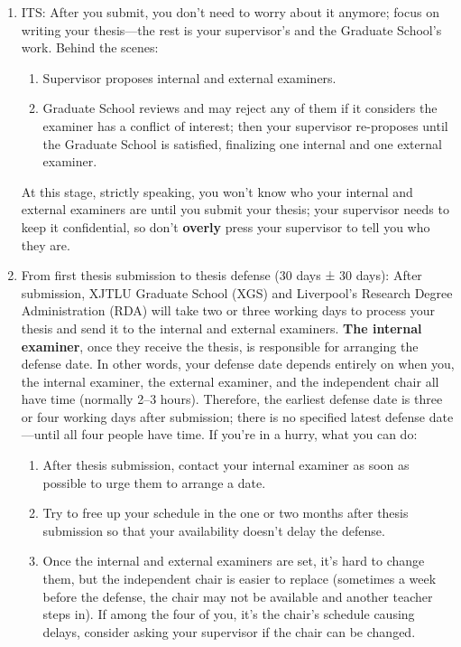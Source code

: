 \begin{enumerate}
    \item ITS: After you submit, you don't need to worry about it anymore; focus on writing your thesis—the rest is your supervisor's and the Graduate School's work. Behind the scenes:
    \begin{enumerate}
        \item Supervisor proposes internal and external examiners.
        \item Graduate School reviews and may reject any of them if it considers the examiner has a conflict of interest; then your supervisor re-proposes until the Graduate School is satisfied, finalizing one internal and one external examiner.
    \end{enumerate}
    At this stage, strictly speaking, you won't know who your internal and external examiners are until you submit your thesis; your supervisor needs to keep it confidential, so don't \textbf{overly} press your supervisor to tell you who they are.
    \item From first thesis submission to thesis defense (30 days ± 30 days): After submission, XJTLU Graduate School (XGS) and Liverpool's Research Degree Administration (RDA) will take two or three working days to process your thesis and send it to the internal and external examiners. \textbf{The internal examiner}, once they receive the thesis, is responsible for arranging the defense date. In other words, your defense date depends entirely on when you, the internal examiner, the external examiner, and the independent chair all have time (normally 2–3 hours). Therefore, the earliest defense date is three or four working days after submission; there is no specified latest defense date—until all four people have time. If you're in a hurry, what you can do:
    \begin{enumerate}
        \item After thesis submission, contact your internal examiner as soon as possible to urge them to arrange a date.
        \item Try to free up your schedule in the one or two months after thesis submission so that your availability doesn't delay the defense.
        \item Once the internal and external examiners are set, it's hard to change them, but the independent chair is easier to replace (sometimes a week before the defense, the chair may not be available and another teacher steps in). If among the four of you, it's the chair's schedule causing delays, consider asking your supervisor if the chair can be changed.

\end{enumerate}
\end{enumerate}
